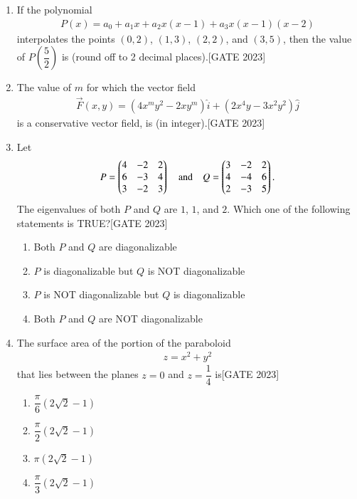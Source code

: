 \documentclass[journal,12pt,onecolumn]{IEEEtran}
\theoremstyle{remark}
\begin{document}
\begin{enumerate}
    \item If the polynomial
    \begin{align*}
    P(x) = a_0 + a_1 x + a_2 x (x - 1) + a_3 x (x - 1)(x - 2)
    \end{align*}
    interpolates the points $(0,2)$, $(1,3)$, $(2,2)$, and $(3,5)$, then the value of $P\left(\dfrac{5}{2}\right)$ is \underline{\hspace{1cm}} (round off to 2 decimal places).\hfill{[GATE 2023]}

    \item The value of $m$ for which the vector field
    \begin{align*}
    \vec{F}(x, y) = (4x^m y^2 - 2 x y^m) \hat{i} + (2x^4 y - 3x^2 y^2) \hat{j}
    \end{align*}
  is a conservative vector field, is \underline{\hspace{1cm}} (in integer).\hfill{[GATE 2023]}
\item Let
    \begin{align*}
    P = \begin{pmatrix} 4 & -2 & 2 \\ 6 & -3 & 4 \\ 3 & -2 & 3 \end{pmatrix} \quad \text{and} \quad Q = \begin{pmatrix} 3 & -2 & 2 \\ 4 & -4 & 6 \\ 2 & -3 & 5 \end{pmatrix}.
    \end{align*}
    The eigenvalues of both $P$ and $Q$ are $1$, $1$, and $2$. Which one of the following statements is TRUE?\hfill{[GATE 2023]}
   
    \begin{enumerate}
        \item Both $P$ and $Q$ are diagonalizable
        \item $P$ is diagonalizable but $Q$ is NOT diagonalizable
        \item $P$ is NOT diagonalizable but $Q$ is diagonalizable
        \item Both $P$ and $Q$ are NOT diagonalizable
    \end{enumerate}
   

    \item The surface area of the portion of the paraboloid
    \begin{align*}
    z = x^2 + y^2
    \end{align*}
    that lies between the planes $z = 0$ and $z = \dfrac{1}{4}$ is\hfill{[GATE 2023]}
    \begin{multicols}{4}
    \begin{enumerate}
        \item $\dfrac{\pi}{6} (2\sqrt{2} - 1)$
        \item $\dfrac{\pi}{2} (2\sqrt{2} - 1)$
        \item $\pi (2\sqrt{2} - 1)$
        \item $\dfrac{\pi}{3} (2\sqrt{2} - 1)$
    \end{enumerate}
    \end{multicols}


\end{enumerate}
\end{document}

